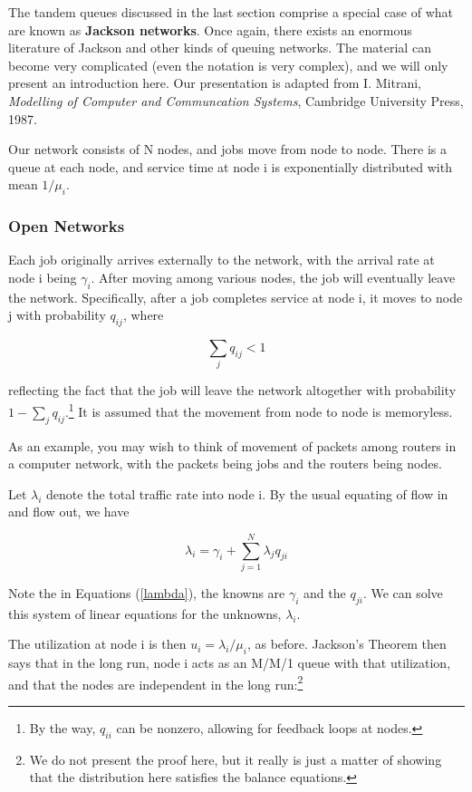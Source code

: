 The tandem queues discussed in the last section comprise a special case
of what are known as {\bf Jackson networks}.  Once again, there exists
an enormous literature of Jackson and other kinds of queuing networks.
The material can become very complicated (even the notation is very
complex), and we will only present an introduction here.  Our
presentation is adapted from I. Mitrani, {\it Modelling of Computer and
Communcation Systems}, Cambridge University Press, 1987.

Our network consists of N nodes, and jobs move from node to node.  There
is a queue at each node, and service time at node i is exponentially
distributed with mean $1/\mu_i$.

\subsubsection{Open Networks}

Each job originally arrives externally to the network, with the arrival
rate at node i being $\gamma_i$.  After moving among various nodes, the
job will eventually leave the network.  Specifically, after a job
completes service at node i, it moves to node j with probability
$q_{ij}$, where 

\begin{equation}
\sum_j q_{ij} < 1
\end{equation}

reflecting the fact that the job will leave the network altogether with
probability $1-\sum_j q_{ij}$.\footnote{By the way, $q_{ii}$ can be
nonzero, allowing for feedback loops at nodes.} It is assumed that the
movement from node to node is memoryless.

As an example, you may wish to think of movement of packets among
routers in a computer network, with the packets being jobs and the
routers being nodes.

Let $\lambda_i$ denote the total traffic rate into node i.  By the usual
equating of flow in and flow out, we have

\begin{equation}
\label{lambda}
\lambda_i = \gamma_i + \sum_{j=1}^N \lambda_j q_{ji}
\end{equation}

Note the in Equations (\ref{lambda}), the knowns are $\gamma_i$ and the
$q_{ji}$.  We can solve this system of linear equations for the
unknowns, $\lambda_i$.

The utilization at node i is then $u_i = \lambda_i/\mu_i$, as before. 
Jackson's Theorem then says that in the long run, node i acts as an
M/M/1 queue with that utilization, and that the nodes are independent in
the long run:\footnote{We do not present the proof here, but it really
is just a matter of showing that the distribution here satisfies the
balance equations.}

